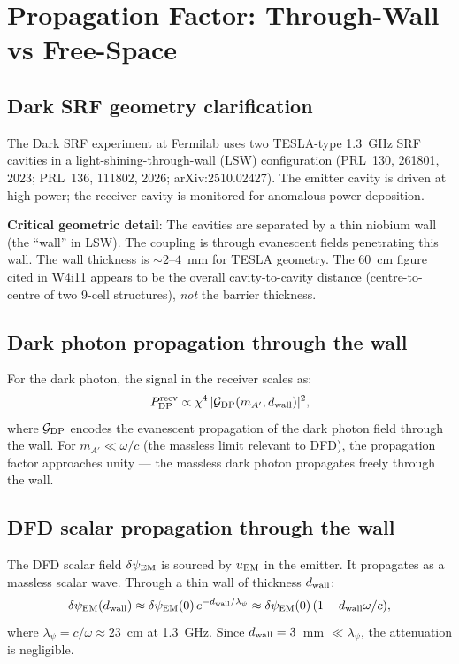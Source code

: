 \documentclass[11pt]{article}
\newcommand{\dpsiEM}{\delta\psi_{\rm EM}}
\theoremstyle{definition}
\theoremstyle{remark}
\begin{document}
\section{Propagation Factor: Through-Wall vs Free-Space}
\label{sec:propagation}

\subsection{Dark SRF geometry clarification}

The Dark SRF experiment at Fermilab uses two TESLA-type 1.3~GHz
SRF cavities in a light-shining-through-wall (LSW) configuration
(PRL~130, 261801, 2023; PRL~136, 111802, 2026; arXiv:2510.02427).
The emitter cavity is driven at high power; the receiver cavity is
monitored for anomalous power deposition.

\textbf{Critical geometric detail}: The cavities are separated by
a thin niobium wall (the ``wall'' in LSW). The coupling is through
evanescent fields penetrating this wall. The wall thickness is
$\sim 2$--$4$~mm for TESLA geometry. The 60~cm figure cited in
W4i11 appears to be the overall cavity-to-cavity distance
(centre-to-centre of two 9-cell structures), \emph{not} the
barrier thickness.

\subsection{Dark photon propagation through the wall}

For the dark photon, the signal in the receiver scales as:
\begin{equation}
P_{\rm DP}^{\rm recv} \propto \chi^4\,|\mathcal{G}_{\rm DP}(m_{A'}, d_{\rm wall})|^2,
\label{eq:P_DP_wall}
\end{equation}
where $\mathcal{G}_{\rm DP}$ encodes the evanescent propagation of the
dark photon field through the wall. For $m_{A'} \ll \omega/c$
(the massless limit relevant to DFD), the propagation factor approaches
unity --- the massless dark photon propagates freely through the wall.

\subsection{DFD scalar propagation through the wall}

The DFD scalar field $\dpsiEM$ is sourced by $u_{\rm EM}$ in the
emitter. It propagates as a massless scalar wave. Through a thin
wall of thickness $d_{\rm wall}$:
\begin{equation}
\dpsiEM(d_{\rm wall}) \approx \dpsiEM(0)\,e^{-d_{\rm wall}/\lambda_\psi}
\approx \dpsiEM(0)\,(1 - d_{\rm wall}\omega/c),
\label{eq:psi_wall}
\end{equation}
where $\lambda_\psi = c/\omega \approx 23$~cm at 1.3~GHz. Since
$d_{\rm wall} = 3$~mm $\ll \lambda_\psi$, the attenuation is negligible.
\end{document}
